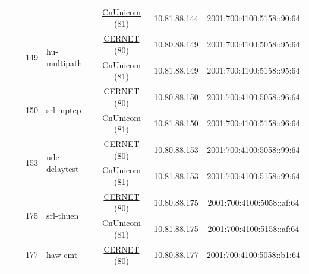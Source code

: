 \begin{small}
\begin{center}
\begin{longtable}{|c|c|c|c|c|c|c|c|}
  &  &  &  & \multicolumn{2}{|c|}{\tiny{\href{http://www.chinaunicom.com}{CnUnicom} (81)}} & \tiny{10.81.88.144} & \tiny{2001:700:4100:5158::90:64} \\* \cline{3-3}\cline{4-4}\cline{5-5}\cline{6-6}\cline{7-7}\cline{8-8}
  &  & \multirow{2}{*}{\tiny{149}} & \multicolumn{1}{|l|}{\multirow{2}{*}{\tiny{hu-multipath}}} & \multicolumn{2}{|c|}{\tiny{\href{http://www.cernet.edu.cn}{CERNET} (80)}} & \tiny{10.80.88.149} & \tiny{2001:700:4100:5058::95:64} \\* \cline{5-5}\cline{6-6}\cline{7-7}\cline{8-8}
  &  &  &  & \multicolumn{2}{|c|}{\tiny{\href{http://www.chinaunicom.com}{CnUnicom} (81)}} & \tiny{10.81.88.149} & \tiny{2001:700:4100:5158::95:64} \\* \cline{3-3}\cline{4-4}\cline{5-5}\cline{6-6}\cline{7-7}\cline{8-8}
  &  & \multirow{2}{*}{\tiny{150}} & \multicolumn{1}{|l|}{\multirow{2}{*}{\tiny{srl-mptcp}}} & \multicolumn{2}{|c|}{\tiny{\href{http://www.cernet.edu.cn}{CERNET} (80)}} & \tiny{10.80.88.150} & \tiny{2001:700:4100:5058::96:64} \\* \cline{5-5}\cline{6-6}\cline{7-7}\cline{8-8}
  &  &  &  & \multicolumn{2}{|c|}{\tiny{\href{http://www.chinaunicom.com}{CnUnicom} (81)}} & \tiny{10.81.88.150} & \tiny{2001:700:4100:5158::96:64} \\* \cline{3-3}\cline{4-4}\cline{5-5}\cline{6-6}\cline{7-7}\cline{8-8}
  &  & \multirow{2}{*}{\tiny{153}} & \multicolumn{1}{|l|}{\multirow{2}{*}{\tiny{ude-delaytest}}} & \multicolumn{2}{|c|}{\tiny{\href{http://www.cernet.edu.cn}{CERNET} (80)}} & \tiny{10.80.88.153} & \tiny{2001:700:4100:5058::99:64} \\* \cline{5-5}\cline{6-6}\cline{7-7}\cline{8-8}
  &  &  &  & \multicolumn{2}{|c|}{\tiny{\href{http://www.chinaunicom.com}{CnUnicom} (81)}} & \tiny{10.81.88.153} & \tiny{2001:700:4100:5158::99:64} \\* \cline{3-3}\cline{4-4}\cline{5-5}\cline{6-6}\cline{7-7}\cline{8-8}
  &  & \multirow{2}{*}{\tiny{175}} & \multicolumn{1}{|l|}{\multirow{2}{*}{\tiny{srl-thuen}}} & \multicolumn{2}{|c|}{\tiny{\href{http://www.cernet.edu.cn}{CERNET} (80)}} & \tiny{10.80.88.175} & \tiny{2001:700:4100:5058::af:64} \\* \cline{5-5}\cline{6-6}\cline{7-7}\cline{8-8}
  &  &  &  & \multicolumn{2}{|c|}{\tiny{\href{http://www.chinaunicom.com}{CnUnicom} (81)}} & \tiny{10.81.88.175} & \tiny{2001:700:4100:5158::af:64} \\* \cline{3-3}\cline{4-4}\cline{5-5}\cline{6-6}\cline{7-7}\cline{8-8}
  &  & \multirow{2}{*}{\tiny{177}} & \multicolumn{1}{|l|}{\multirow{2}{*}{\tiny{haw-cmt}}} & \multicolumn{2}{|c|}{\tiny{\href{http://www.cernet.edu.cn}{CERNET} (80)}} & \tiny{10.80.88.177} & \tiny{2001:700:4100:5058::b1:64} \\* \cline{5-5}\cline{6-6}\cline{7-7}\cline{8-8}

\end{longtable}
\end{center}
\end{small}
